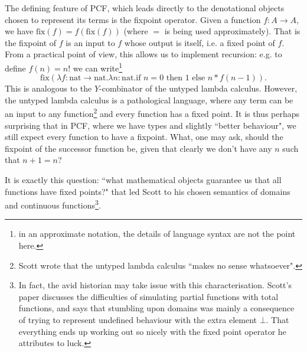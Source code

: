 \documentclass[12pt,a4paper,twoside,openright]{report}
\begin{document}
The defining feature of PCF, which leads directly to the denotational objects chosen to represent its terms is the fixpoint operator. Given a function $f : A \to A$, we have $\text{fix}(f) = f (\text{fix}(f))$ (where $=$ is being used approximately). That is the fixpoint of $f$ is an input to $f$ whose output is itself, i.e. a fixed point of $f$. From a practical point of view, this allows us to implement recursion: e.g. to define $f(n) = n!$ we can write\footnote{in an approximate notation, the details of language syntax are not the point here.}
\[
\text{fix}\left( \lambda f : \text{nat} \to \text{nat}. \lambda n: \text{nat}. \text{if } n = 0 \text{ then } 1 \text{ else } n * f (n-1)\right).
\] This is analogous to the $Y$-combinator of the untyped lambda calculus. However, the untyped lambda calculus is a pathological language, where any term can be an input to any function\footnote{Scott wrote that the untyped lambda calculus ``makes no sense whatsoever".} and every function has a fixed point. It is thus perhaps surprising that in PCF, where we have types and slightly ``better behaviour", we still expect every function to have a fixpoint. What, one may ask, should the fixpoint of the successor function be, given that clearly we don't have any $n$ such that $n+1 = n$? 

It is exactly this question: ``what mathematical objects guarantee us that all functions have fixed points?" that led Scott to his chosen semantics of domains and continuous functions\footnote{In fact, the avid historian may take issue with this characterisation. Scott's paper discusses the difficulties of simulating partial functions with total functions, and says that stumbling upon domains was mainly a consequence of trying to represent undefined behaviour with the extra element $\bot$. That everything ends up working out so nicely with the fixed point operator he attributes to luck.}.

 
\end{document}
